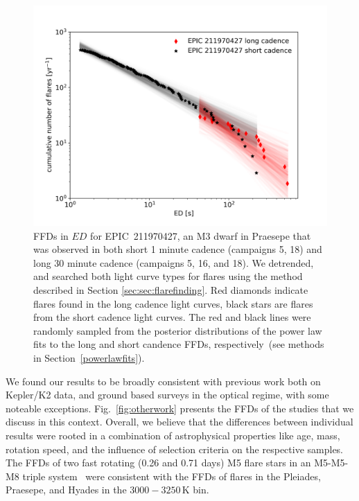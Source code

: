 \documentclass{aa}
\begin{document}
\begin{figure}[ht!]
    \centering
    \includegraphics[width=\hsize]{pics/FFDs/EPIC211970427_long_vs_short_cadence_ffd.png}
    \caption{FFDs in $ED$ for EPIC~211970427, an M3 dwarf in Praesepe that was observed in both short 1 minute cadence (campaigns 5, 18) and long 30 minute cadence (campaigns 5, 16, and 18). We detrended, and searched both light curve types for flares using the method described in Section \ref{sec:sec:flarefinding}. Red diamonds indicate flares found in the long cadence light curves, black stars are flares from the short cadence light curves. The red and black lines were randomly sampled from the posterior distributions of the power law fits to the long and short candence FFDs, respectively~(see methods in Section~\ref{powerlawfits}).}          
    \label{fig:shortlong}
\end{figure}
We found our results to be broadly consistent with previous work both on Kepler/K2 data, and ground based surveys in the optical regime, with some noteable exceptions. Fig.~\ref{fig:otherwork} presents the FFDs of the studies that we discuss in this context. Overall, we believe that the differences between individual results were rooted in a combination of astrophysical properties like age, mass, rotation speed, and the influence of selection criteria on the respective samples. 
\\
The FFDs of two fast rotating (0.26 and 0.71 days) M5 flare stars in an M5-M5-M8 triple system~\citep{lurie2015} were consistent with the FFDs of flares in the Pleiades, Praesepe, and Hyades in the $3000-3250\,$K bin. 
\end{document}
